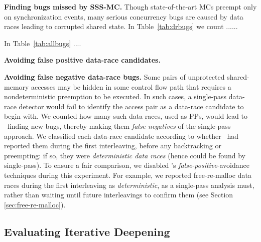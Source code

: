 {\bf Finding bugs missed by SSS-MC.}
Though state-of-the-art MCs preempt only on synchronization events, many serious concurrency bugs are caused by data races leading to corrupted shared state.
In Table~\ref{tab:drbugs} we count ...... %

In Table~\ref{tab:allbugs} .... %

{\bf Avoiding false positive data-race candidates.}


{\bf Avoiding false negative data-race bugs.}
Some pairs of unprotected shared-memory accesses may be hidden in some control flow path that requires a nondeterministic preemption to be executed.
In such cases, a single-pass data-race detector
would fail
to identify the access pair as a data-race candidate to begin with.
%
We counted how many such data-races, used as PPs, would lead to \landslide~finding new bugs,
thereby making them {\em false negatives} of the single-pass approach.
We classified each data-race candidate according to whether \landslide~had reported them during the first interleaving, before any backtracking or preempting: if so, they were {\em deterministic data races} (hence could be found by single-pass).
%
To ensure a fair comparison, we disabled \landslide's {\em false-positive}-avoidance techniques during this experiment.
For example, we reported free-re-malloc data races during the first interleaving as {\em deterministic}, as a single-pass analysis must, rather than waiting until future interleavings to confirm them (see Section \ref{sec:free-re-malloc}).

\subsection{Evaluating Iterative Deepening}


